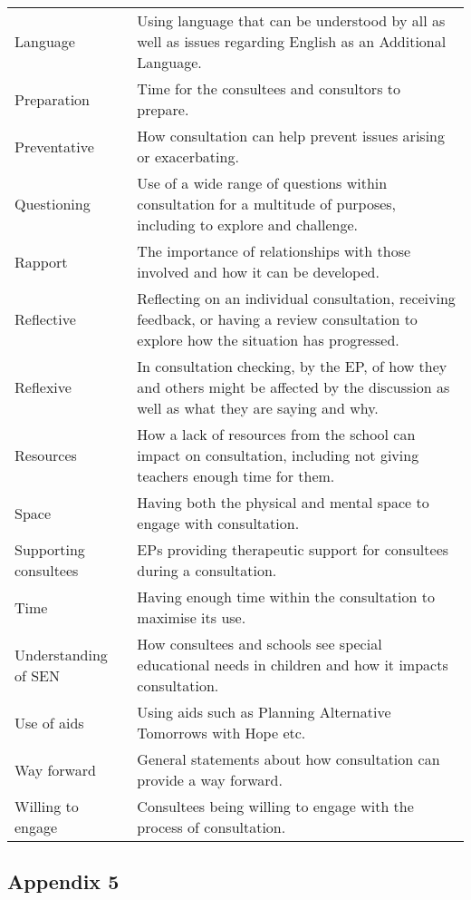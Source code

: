 \documentclass[
]{article}
\begin{document}
\begin{longtable}[]{@{}
  >{\raggedright\arraybackslash}p{}
  >{\raggedright\arraybackslash}p{}@{}}
Language & Using language that can be understood by all as well as
issues regarding English as an Additional Language. \\
Preparation & Time for the consultees and consultors to prepare. \\
Preventative & How consultation can help prevent issues arising or
exacerbating. \\
Questioning & Use of a wide range of questions within consultation for a
multitude of purposes, including to explore and challenge. \\
Rapport & The importance of relationships with those involved and how it
can be developed. \\
Reflective & Reflecting on an individual consultation, receiving
feedback, or having a review consultation to explore how the situation
has progressed. \\
Reflexive & In consultation checking, by the EP, of how they and others
might be affected by the discussion as well as what they are saying and
why. \\
Resources & How a lack of resources from the school can impact on
consultation, including not giving teachers enough time for them. \\
Space & Having both the physical and mental space to engage with
consultation. \\
Supporting consultees & EPs providing therapeutic support for consultees
during a consultation. \\
Time & Having enough time within the consultation to maximise its
use. \\
Understanding of SEN & How consultees and schools see special
educational needs in children and how it impacts consultation. \\
Use of aids & Using aids such as Planning Alternative Tomorrows with
Hope etc. \\
Way forward & General statements about how consultation can provide a
way forward. \\
Willing to engage & Consultees being willing to engage with the process
of consultation. \\
\bottomrule
\end{longtable}

\hypertarget{appendix-5}{%
\subsection{Appendix 5}\label{appendix-5}}
\end{document}
